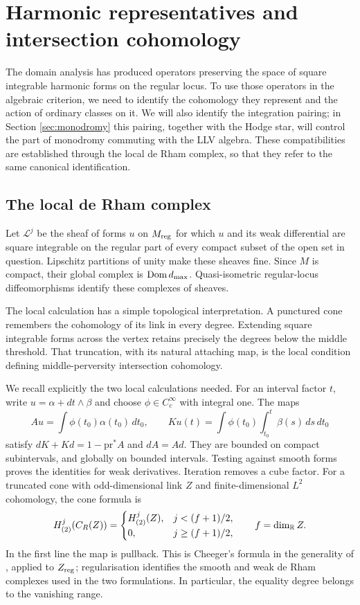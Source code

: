 \section{Harmonic representatives and intersection cohomology}\label{sec:hodge}

The domain analysis has produced operators preserving the space of
square integrable harmonic forms on the regular locus. To use those
operators in the algebraic criterion, we need to identify the
cohomology they represent and the action of ordinary classes on it.
We will also identify the integration pairing; in Section
\ref{sec:monodromy} this pairing, together with the Hodge star,
will control the part of monodromy commuting with the LLV algebra.
These compatibilities are established through the local de Rham
complex, so that they refer to the same canonical identification.

\subsection{The local de Rham complex}
Let $\mathcal L^j$ be the sheaf of forms $u$ on $M_{\mathrm{reg}}$ for
which $u$ and its weak differential are square integrable on the
regular part of every compact subset of the open set in question.
Lipschitz partitions of unity make these sheaves fine. Since $M$
is compact, their global complex is $\operatorname{Dom} d_{\max}$.
Quasi-isometric regular-locus diffeomorphisms identify these
complexes of sheaves.

The local calculation has a simple topological interpretation.
A punctured cone remembers the cohomology of its link in every
degree. Extending square integrable forms across the vertex
retains precisely the degrees below the middle threshold. That
truncation, with its natural attaching map, is the local condition
defining middle-perversity intersection cohomology.

We recall explicitly the two local calculations needed. For an
interval factor $t$, write $u=\alpha+dt\wedge\beta$ and choose
$\phi\in C_c^\infty$ with integral one. The maps
\[
 Au=\int\phi(t_0)\alpha(t_0)\,dt_0,\qquad
 Ku(t)=\int\phi(t_0)\int_{t_0}^t\beta(s)\,ds\,dt_0
\]
satisfy $dK+Kd=1-\mathrm{pr}^*A$ and $dA=Ad$.
They are bounded on compact subintervals, and globally on bounded
intervals. Testing against smooth forms proves the identities
for weak derivatives. Iteration removes a cube factor.
For a truncated cone with odd-dimensional link $Z$ and
finite-dimensional $L^2$ cohomology, the cone formula is
\begin{equation}\label{eq:cone-cohomology}
 H^j_{(2)}(C_R(Z))=
 \begin{cases}H^j_{(2)}(Z),&j<(f+1)/2,\\
 0,&j\ge(f+1)/2,
 \end{cases}\qquad f=\dim_{\mathbb R}Z.
\end{equation}
In the first line the map is pullback. This is Cheeger's formula
in the generality of \cite[Proposition~2.4]{bhs92}, applied to
$Z_{\mathrm{reg}}$; regularisation identifies the smooth and weak
de Rham complexes used in the two formulations. In particular,
the equality degree belongs to the vanishing range.


